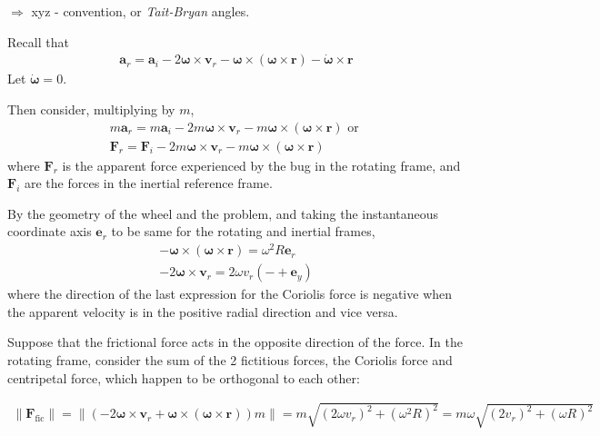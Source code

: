$\Longrightarrow$ xyz - convention, or \emph{Tait-Bryan} angles.


Recall that 
\[
\begin{gathered}
	\mathbf{a}_r = \mathbf{a}_i - 2\mathbf{\omega} \times \mathbf{v}_r - \mathbf{\omega} \times (\mathbf{\omega} \times \mathbf{r}) - \dot{\mathbf{\omega}} \times \mathbf{r}
\end{gathered}
\]
Let $\dot{\mathbf{\omega}} = 0$.

Then consider, multiplying by $m$,
\[
\begin{gathered}
	m \mathbf{a}_r = m \mathbf{a}_i - 2 m \mathbf{\omega} \times \mathbf{v}_r - m \mathbf{\omega} \times (\mathbf{\omega} \times \mathbf{r}) \text{ or }  \\
		\mathbf{F}_r = \mathbf{F}_i - 2 m \mathbf{\omega} \times \mathbf{v}_r - m \mathbf{\omega} \times (\mathbf{\omega} \times \mathbf{r})
\end{gathered}
\]
where $\mathbf{F}_r$ is the apparent force experienced by the bug in the rotating frame, and $\mathbf{F}_i$ are the forces in the inertial reference frame.

By the geometry of the wheel and the problem, and taking the instantaneous coordinate axis $\mathbf{e}_r$ to be same for the rotating and inertial frames,
\[
\begin{gathered}
	-\mathbf{\omega} \times ( \mathbf{\omega} \times \mathbf{r}) = \omega^2 R \mathbf{e}_r \\
	-2 \mathbf{\omega} \times \mathbf{v}_r = 2 \omega v_r (-+ \mathbf{e}_y)
\end{gathered}
\]
where the direction of the last expression for the Coriolis force is negative when the apparent velocity is in the positive radial direction and vice versa.

Suppose that the frictional force acts in the opposite direction of the force. In the rotating frame, consider the sum of the 2 fictitious forces, the Coriolis force and centripetal force, which happen to be orthogonal to each other:

\[
\begin{gathered}
	\| \mathbf{F}_{\text{fic}} \| = \| ( - 2 \mathbf{\omega} \times \mathbf{v}_r  + \mathbf{\omega} \times (\mathbf{\omega} \times \mathbf{r})) m \| = m \sqrt{(2\omega v_r)^2 + (\omega^2 R)^2 } = m \omega \sqrt{(2v_r)^2 + (\omega R)^2 }
\end{gathered}
\]

